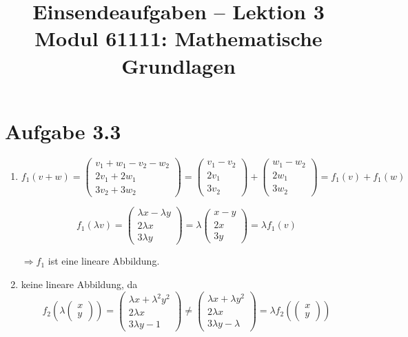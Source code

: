 \documentclass[a4paper,12pt]{article}
\title{Einsendeaufgaben -- Lektion 3\\[0.5em]
\large Modul 61111: Mathematische Grundlagen}
\author{}
\date{}
\begin{document}
\maketitle

\section*{Aufgabe 3.3}

\begin{enumerate}[label=\alph*)]

    \item
    \[
        f_1(v+w)
        = \begin{pmatrix}v_1+w_1-v_2-w_2\\2v_1+2w_1\\3v_2+3w_2\end{pmatrix}
        = \begin{pmatrix}v_1-v_2\\2v_1\\3v_2\end{pmatrix}
        + \begin{pmatrix}w_1-w_2\\2w_1\\3w_2\end{pmatrix}
        = f_1(v) + f_1(w)
    \]

    \[
        f_1(\lambda v)
        = \begin{pmatrix}\lambda x - \lambda y\\2\lambda x\\3\lambda y\end{pmatrix}
        = \lambda \begin{pmatrix}x-y\\2x\\3y\end{pmatrix}
        = \lambda f_1(v)
    \]

    $\Rightarrow f_1$ ist eine lineare Abbildung.

    \item keine lineare Abbildung, da
    \[
        f_2\!\left(\lambda\begin{pmatrix}x\\y\end{pmatrix}\right)
        = \begin{pmatrix}\lambda x + \lambda^2 y^2\\2\lambda x\\3\lambda y - 1\end{pmatrix}
        \neq
        \begin{pmatrix}\lambda x + \lambda y^2\\2\lambda x\\3\lambda y - \lambda\end{pmatrix}
        = \lambda f_2\!\left(\begin{pmatrix}x\\y\end{pmatrix}\right)
    \]


\end{enumerate}
\end{document}
